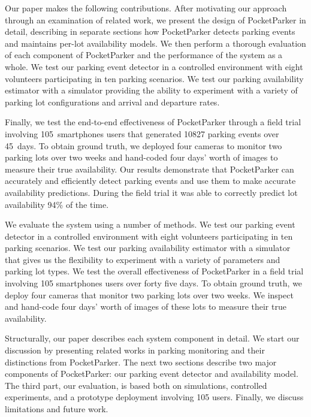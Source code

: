 Our paper makes the following contributions. After motivating our approach
through an examination of related work, we present the design of PocketParker
in detail, describing in separate sections how PocketParker detects parking
events and maintains per-lot availability models. We then perform a thorough
evaluation of each component of PocketParker and the performance of the
system as a whole. We test our parking event detector in a controlled
environment with eight volunteers participating in ten parking scenarios. We
test our parking availability estimator with a simulator providing the
ability to experiment with a variety of parking lot configurations and
arrival and departure rates.

Finally, we test the end-to-end effectiveness of PocketParker through a field
trial involving 105~smartphones users that generated \num{10827} parking
events over 45~days. To obtain ground truth, we deployed four cameras to
monitor two parking lots over two weeks and hand-coded four days' worth of
images to measure their true availability. Our results demonstrate that
PocketParker can accurately and efficiently detect parking events and use
them to make accurate availability predictions. During the field trial it was
able to correctly predict lot availability 94\% of the time.

We evaluate the system using a number of methods.  We test our parking event
detector in a controlled environment with eight volunteers participating in
ten parking scenarios. We test our parking availability estimator with a
simulator that gives us the flexibility to experiment with a variety of
parameters and parking lot types.  We test the overall effectiveness of
PocketParker in a field trial involving 105 smartphones users over forty five
days. To obtain ground truth, we deploy four cameras that monitor two parking
lots over two weeks. We inspect and hand-code four days' worth of images of
these lots to measure their true availability.

Structurally, our paper describes each system component in detail. We start
our discussion by presenting related works in parking monitoring and their
distinctions from PocketParker.  The next two sections describe two major
components of PocketParker: our parking event detector and availability model.
The third part, our evaluation, is based both on simulations, controlled
experiments, and a prototype deployment involving 105 users.  Finally, we
discuss limitations and future work.

